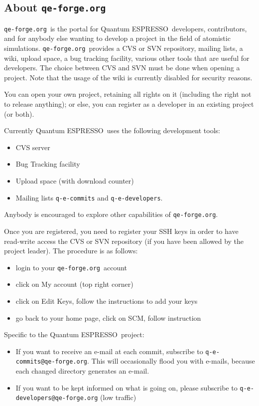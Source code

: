 \documentclass[12pt,a4paper]{article}
\def\qe{{\sc Quantum ESPRESSO}}
\def\qeforge{\texttt{qe-forge.org}}
\begin{document}
\subsection{About \qeforge}
\qeforge\ is the portal for \qe\ developers, contributors,
and for anybody else wanting to develop a project in the
field of atomistic simulations.  \qeforge\ provides a CVS 
or SVN repository, mailing lists, a wiki, upload space, a
bug tracking facility, various other tools that are useful 
for developers. The choice between CVS and SVN must be done
when opening a project. Note that the usage of the wiki is 
currently disabled for security reasons.

You can open your own project, retaining all rights on it (including 
the right not to release anything); or else, you can register as a 
developer in an existing project (or both).

Currently \qe\ uses the following development tools:
\begin{itemize}
\item CVS server
\item Bug Tracking facility
\item Upload space (with download counter)
\item Mailing lists \texttt{q-e-commits} and \texttt{q-e-developers}.
\end{itemize}
Anybody is encouraged to explore other capabilities of \qeforge.

Once you are registered, you need to register your SSH keys in order
to have read-write access the CVS or SVN repository (if you have been
allowed by the project leader). The procedure is as follows:
\begin{itemize}
\item login to your \qeforge\ account
\item click on My account (top right corner)
\item click on Edit Keys, follow the instructions to add your keys
\item go back to your home page, click on SCM, follow instruction
\end{itemize}

Specific to the \qe\ project:
\begin{itemize}
\item If you want to receive an e-mail at each commit, subscribe to
\texttt{q-e-commits@qe-forge.org}. This will occasionally 
flood you with e-mails, because each changed directory generates 
an e-mail. 
\item If you want to be kept informed on what is going on, please
subscribe to \texttt{q-e-developers@qe-forge.org} (low traffic)
\end{itemize}
\end{document}
